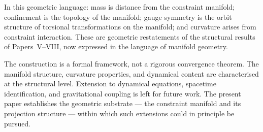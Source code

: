 \documentclass[12pt]{article}
\begin{document}
In this geometric language: mass is distance from the constraint manifold; confinement is the topology of the manifold; gauge symmetry is the orbit structure of torsional transformations on the manifold; and curvature arises from constraint interaction. These are geometric restatements of the structural results of Papers~V--VIII, now expressed in the language of manifold geometry.

The construction is a formal framework, not a rigorous convergence theorem. The manifold structure, curvature properties, and dynamical content are characterised at the structural level. Extension to dynamical equations, spacetime identification, and gravitational coupling is left for future work. The present paper establishes the geometric substrate --- the constraint manifold and its projection structure --- within which such extensions could in principle be pursued.



\end{document}
